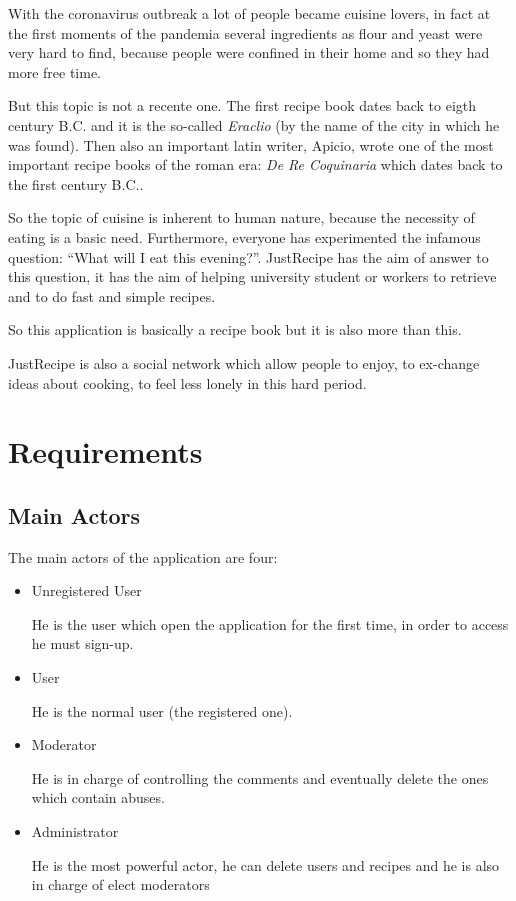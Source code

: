 \documentclass[a4paper]{report}
\begin{document}
\noindent With the coronavirus outbreak a lot of people became cuisine lovers, in fact at the first moments of the pandemia several ingredients as flour and yeast were very hard to find, because people were confined in their home and so they had more free time.

\noindent But this topic is not a recente one. The first recipe book dates back to eigth century B.C. and it is the so-called \emph{Eraclio} (by the name of the city in which he was found). Then also an important latin writer, Apicio, wrote one of the most important recipe books of the roman era: \emph{De Re Coquinaria} which dates back to the first century B.C..
 
\noindent So the topic of cuisine is inherent to human nature, because the necessity of eating is a basic need.
Furthermore, everyone has experimented the infamous question: “What will I eat this evening?”. JustRecipe has the aim of answer to this question, it has the aim of helping university student or workers to retrieve and to do fast and simple recipes.

\noindent So this application is basically a recipe book but it is also more than this.

\noindent JustRecipe is also a social network which allow people to enjoy, to ex-change ideas about cooking, to feel less lonely in this hard period.

\section{Requirements}
\subsection{Main Actors}
The main actors of the application are four:
\begin{itemize}
	\item Unregistered User
	
	\noindent He is the user which open the application for the first time, in order to access he must sign-up.
	
	\item User
	
	\noindent He is the normal user (the registered one).
	
	\item Moderator
	
	\noindent He is in charge of controlling the comments and eventually delete the ones which contain abuses.
	
	\item Administrator
	
	\noindent He is the most powerful actor, he can delete users and recipes and he is also in charge of elect moderators
\end{itemize}
\end{document}
